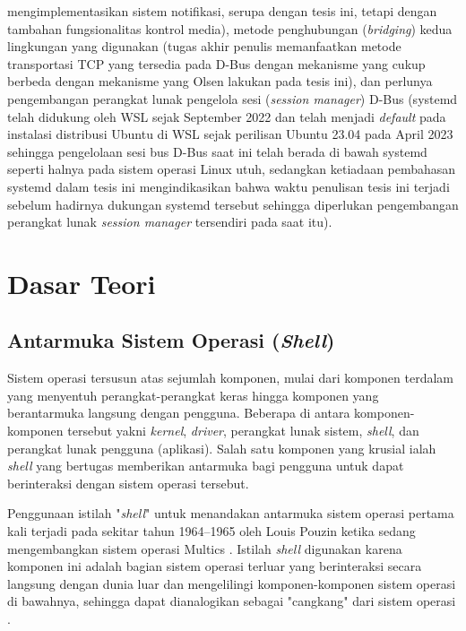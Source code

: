 mengimplementasikan sistem notifikasi, serupa dengan tesis ini, tetapi dengan tambahan fungsionalitas kontrol media), metode penghubungan (\textit{bridging}) kedua lingkungan yang digunakan (tugas akhir penulis memanfaatkan metode transportasi TCP yang tersedia pada D-Bus dengan mekanisme yang cukup berbeda dengan mekanisme yang Olsen lakukan pada tesis ini), dan perlunya pengembangan perangkat lunak pengelola sesi (\textit{session manager}) D-Bus (systemd telah didukung oleh WSL sejak September 2022 \cite{systemd-support-is-now-available-in-wsl} dan telah menjadi \textit{default} pada instalasi distribusi Ubuntu di WSL sejak perilisan Ubuntu 23.04 pada April 2023 \cite{ubuntu-2304-release-roundup-systemd-now-becomes-default-for-ubuntu-on-wsl} sehingga pengelolaan sesi bus D-Bus saat ini telah berada di bawah systemd seperti halnya pada sistem operasi Linux utuh, sedangkan ketiadaan pembahasan systemd dalam tesis ini mengindikasikan bahwa waktu penulisan tesis ini terjadi sebelum hadirnya dukungan systemd tersebut sehingga diperlukan pengembangan perangkat lunak \textit{session manager} tersendiri pada saat itu).

\section{Dasar Teori}

\subsection{Antarmuka Sistem Operasi (\textit{Shell})}

Sistem operasi tersusun atas sejumlah komponen, mulai dari komponen terdalam yang menyentuh perangkat-perangkat keras hingga komponen yang berantarmuka langsung dengan pengguna. Beberapa di antara komponen-komponen tersebut yakni \textit{kernel}, \textit{driver}, perangkat lunak sistem, \textit{shell}, dan perangkat lunak pengguna (aplikasi). Salah satu komponen yang krusial ialah \textit{shell} yang bertugas memberikan antarmuka bagi pengguna untuk dapat berinteraksi dengan sistem operasi tersebut.

Penggunaan istilah "\textit{shell}" untuk menandakan antarmuka sistem operasi pertama kali terjadi pada sekitar tahun 1964--1965 oleh Louis Pouzin ketika sedang mengembangkan sistem operasi Multics \cite{origin-of-the-shell-name}. Istilah \textit{shell} digunakan karena komponen ini adalah bagian sistem operasi terluar yang berinteraksi secara langsung dengan dunia luar dan mengelilingi komponen-komponen sistem operasi di bawahnya, sehingga dapat dianalogikan sebagai "cangkang" dari sistem operasi \cite{shell-jargon-explanation}.

